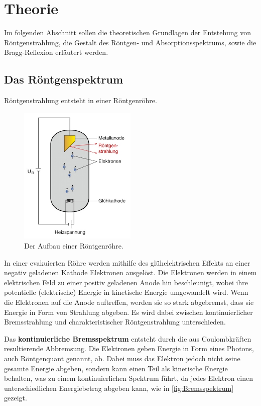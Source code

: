 \section{Theorie}
\label{sec:theorie}

    Im folgenden Abschnitt sollen die theoretischen Grundlagen der Entstehung von Röntgenstrahlung,
    die Gestalt des Röntgen- und Absorptionsspektrums,
    sowie die Bragg-Reflexion erläutert werden.

\subsection{Das Röntgenspektrum}

    Röntgenstrahlung entsteht in einer Röntgenröhre.\\

    \begin{figure}
        \centering
        \includegraphics[width=0.5\textwidth]{content/img/Roentgenroehre.jpg}
        \caption{Der Aufbau einer Röntgenröhre. \cite{roentgenroehre}}
        \label{fig:Röntgenröhre}
    \end{figure}

    In einer evakuierten Röhre werden mithilfe des glühelektrischen Effekts an einer negativ geladenen Kathode Elektronen ausgelöst.
    Die Elektronen werden in einem elektrischen Feld zu einer positiv geladenen Anode hin beschleunigt,
    wobei ihre potentielle (elektrische) Energie in kinetische Energie umgewandelt wird.
    Wenn die Elektronen auf die Anode auftreffen,
    werden sie so stark abgebremst,
    dass sie Energie in Form von Strahlung abgeben.
    Es wird dabei zwischen kontinuierlicher Bremsstrahlung und charakteristischer Röntgenstrahlung unterschieden.

    \label{sec:theorie:bremsspektrum}
    Das \textbf{kontinuierliche Bremsspektrum} entsteht durch die aus Coulombkräften resultierende Abbremsung.
    Die Elektronen geben Energie in Form eines Photons,
    auch Röntgenquant genannt,
    ab.
    Dabei muss das Elektron jedoch nicht seine gesamte Energie abgeben,
    sondern kann einen Teil als kinetische Energie behalten,
    was zu einem kontinuierlichen Spektrum führt,
    da jedes Elektron einen unterschiedlichen Energiebetrag abgeben kann,
    wie in \autoref{fig:Bremsspektrum} gezeigt.

